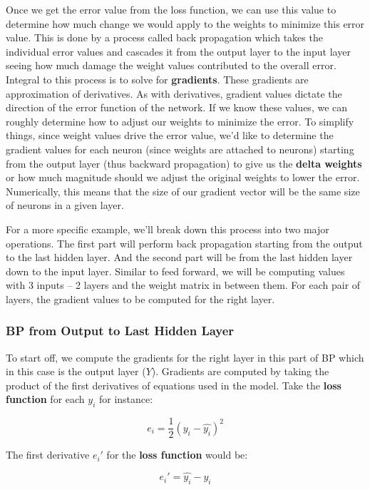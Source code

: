 \documentclass[a4paper]{article}
\begin{document}
Once we get the error value from the loss function, we can use this value to determine how much change we would apply to the weights to minimize this error value. This is done by a process called back propagation which takes the individual error values and cascades it from the output layer to the input layer seeing how much damage the weight values contributed to the overall error. Integral to this process is to solve for \textbf{gradients}. These gradients are approximation of derivatives. As with derivatives, gradient values dictate the direction of the error function of the network. If we know these values, we can roughly determine how to adjust our weights to minimize the error. To simplify things, since weight values drive the error value, we'd like to determine the gradient values for each neuron (since weights are attached to neurons) starting from the output layer (thus backward propagation) to give us the \textbf{delta weights} or how much magnitude should we adjust the original weights to lower the error. Numerically, this means that the size of our gradient vector will be the same size of neurons in a given layer.

For a more specific example, we'll break down this process into two major operations. The first part will perform back propagation starting from the output to the last hidden layer. And the second part will be from the last hidden layer down to the input layer. Similar to feed forward, we will be computing values with 3 inputs -- 2 layers and the weight matrix in between them. For each pair of layers, the gradient values to be computed for the right layer.

\subsubsection{BP from Output to Last Hidden Layer}
To start off, we compute the gradients for the right layer in this part of BP which in this case is the output layer ($Y$). Gradients are computed by taking the product of the first derivatives of equations used in the model. Take the \textbf{loss function} for each $y_{i}$ for instance:

\begin{equation}
  e_{i}={\frac{1}{2}(y_{i}-\widehat{y_{i}})^2}
\end{equation}

The first derivative $e_{i}'$ for the \textbf{loss function} would be:

\begin{equation}
  e_{i}'={\widehat{y_{i}} - y_{i}}
\end{equation}
\end{document}
